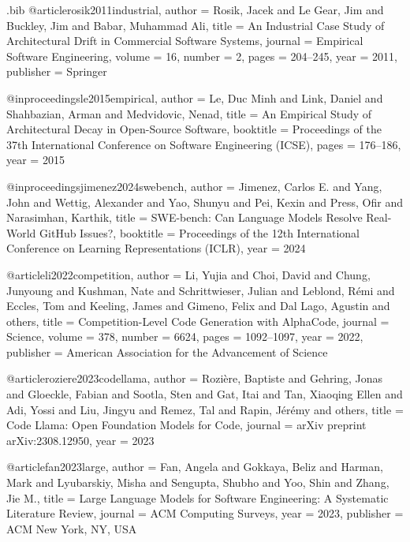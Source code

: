 \begin{filecontents*}{\jobname.bib}
@article{rosik2011industrial,
  author    = {Rosik, Jacek and Le Gear, Jim and Buckley, Jim and Babar, Muhammad Ali},
  title     = {An Industrial Case Study of Architectural Drift in Commercial Software Systems},
  journal   = {Empirical Software Engineering},
  volume    = {16},
  number    = {2},
  pages     = {204--245},
  year      = {2011},
  publisher = {Springer}
}

@inproceedings{le2015empirical,
  author    = {Le, Duc Minh and Link, Daniel and Shahbazian, Arman and Medvidovic, Nenad},
  title     = {An Empirical Study of Architectural Decay in Open-Source Software},
  booktitle = {Proceedings of the 37th International Conference on Software Engineering (ICSE)},
  pages     = {176--186},
  year      = {2015}
}

@inproceedings{jimenez2024swebench,
  author    = {Jimenez, Carlos E. and Yang, John and Wettig, Alexander and Yao, Shunyu and Pei, Kexin and Press, Ofir and Narasimhan, Karthik},
  title     = {SWE-bench: Can Language Models Resolve Real-World GitHub Issues?},
  booktitle = {Proceedings of the 12th International Conference on Learning Representations (ICLR)},
  year      = {2024}
}

@article{li2022competition,
  author    = {Li, Yujia and Choi, David and Chung, Junyoung and Kushman, Nate and Schrittwieser, Julian and Leblond, R{\'e}mi and Eccles, Tom and Keeling, James and Gimeno, Felix and Dal Lago, Agustin and others},
  title     = {Competition-Level Code Generation with {AlphaCode}},
  journal   = {Science},
  volume    = {378},
  number    = {6624},
  pages     = {1092--1097},
  year      = {2022},
  publisher = {American Association for the Advancement of Science}
}

@article{roziere2023codellama,
  author    = {Rozi{\`e}re, Baptiste and Gehring, Jonas and Gloeckle, Fabian and Sootla, Sten and Gat, Itai and Tan, Xiaoqing Ellen and Adi, Yossi and Liu, Jingyu and Remez, Tal and Rapin, J{\'e}r{\'e}my and others},
  title     = {Code Llama: Open Foundation Models for Code},
  journal   = {arXiv preprint arXiv:2308.12950},
  year      = {2023}
}

@article{fan2023large,
  author    = {Fan, Angela and Gokkaya, Beliz and Harman, Mark and Lyubarskiy, Misha and Sengupta, Shubho and Yoo, Shin and Zhang, Jie M.},
  title     = {Large Language Models for Software Engineering: A Systematic Literature Review},
  journal   = {ACM Computing Surveys},
  year      = {2023},
  publisher = {ACM New York, NY, USA}
}


\end{filecontents*}
